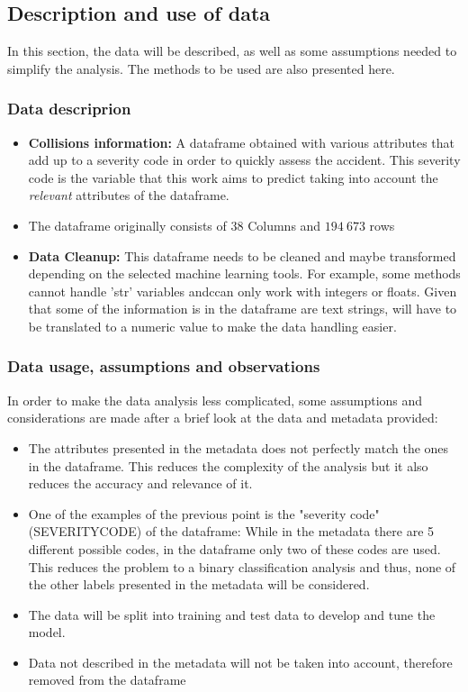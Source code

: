 \documentclass{article}
\begin{document}
	\subsection{Description and use of data}
		In this section, the data will be described, as well as some assumptions needed to simplify the analysis. The methods to be used are also presented here. 
		
		\subsubsection{Data descriprion}
		\begin{itemize}
			\item \textbf{Collisions information:} A dataframe obtained with various attributes that add up to a severity code in order to quickly assess the accident. This severity code is the variable that this work aims to predict taking into account the \textit{relevant} attributes of the dataframe.
			\item The dataframe originally consists of 38 Columns and $194\ 673$ rows 
			\item \textbf{Data Cleanup:} This dataframe needs to be cleaned and maybe transformed depending on the selected machine learning tools. For example, some methods cannot handle 'str' variables andccan only work with integers or floats. Given that some of the information is in the dataframe are text strings, will have to be translated to a numeric value to make the data handling easier.				
		\end{itemize}
		\subsubsection{Data usage, assumptions and observations}
			In order to make the data analysis less complicated, some assumptions and considerations are made after a brief look at the data and metadata provided:
			\begin{itemize}
				\item The attributes presented in the metadata does not perfectly match the ones in the dataframe. This reduces the complexity of the analysis but it also reduces the accuracy and relevance of it.
				\item One of the examples of the previous point is the "severity code"(SEVERITYCODE) of the dataframe: While in the metadata there are 5 different possible codes, in the dataframe only two of these codes are used. This reduces the problem to a binary classification analysis and thus, none of the other labels presented in the metadata will be considered.
				\item The data will be split into training and test data to develop and tune the model.	
				\item Data not described in the metadata will not be taken into account, therefore removed from the dataframe					
			\end{itemize} 	
		\newpage
\end{document}
